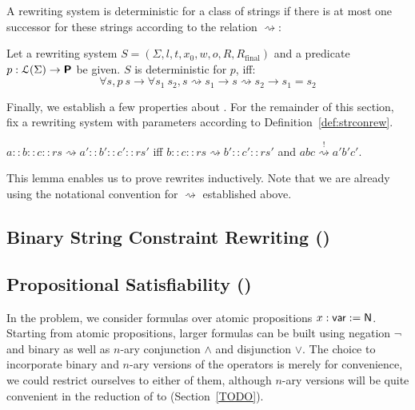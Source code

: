 \documentclass[a4paper,UKenglish,cleveref, autoref]{lipics-v2019}
\newcommand{\strent}{\rightsquigarrow}
\newcommand{\constrent}{\overset{!}{\rightsquigarrow}}
\newcommand{\Rfinal}{R_{\text{final}}}
\begin{document}
A rewriting system is deterministic for a class of strings if there is at most one successor for these strings according to the relation $\strent{}$:
\begin{definition}[Determinism]\label{def:rewdet}
  Let a rewriting system $S = (\Sigma, l, t, x_0, w, o, R, \Rfinal)$ and a predicate $p : \mathcal{L} (\Sigma) \rightarrow \textsf{\bfseries P}$ be given. 
  $S$ is deterministic for $p$, iff: 
  \[ \forall s, p~s \rightarrow \forall s_1~s_2, s \strent{} s_1 \rightarrow s \strent{} s_2 \rightarrow s_1 = s_2 \]
\end{definition}


Finally, we establish a few properties about \strconrew{}. For the remainder of this section, fix a rewriting system with parameters according to Definition~\ref{def:strconrew}.

\begin{lemma}\label{lem:rewind}
  $a :: b :: c :: rs \strent{} a' :: b' :: c' :: rs'$ iff $b :: c :: rs \strent{} b' :: c' :: rs'$ and $abc \constrent{} a'b'c'$. 
\end{lemma}
This lemma enables us to prove rewrites inductively. Note that we are already using the notational convention for $\strent{}$ established above.

\subsection{Binary String Constraint Rewriting (\binstrconrew{})}


\subsection{Propositional Satisfiability (\csat{})}
\newcommand{\var}{\textsf{var}}
\newcommand{\literal}{\textsf{literal}}
\newcommand{\clause}{\textsf{clause}}
\newcommand{\cnf}{\textsf{cnf}}
\newcommand{\assgn}{\textsf{assgn}}
\newcommand{\eval}[2]{\mathcal{E}~#1~#2}
\newcommand{\for}{\textsf{For}}


In the \csat{} problem, we consider formulas over atomic propositions $x : \var := \nat$. Starting from atomic propositions, larger formulas can be built using negation $\lnot$ and binary as well as $n$-ary conjunction $\land$ and disjunction $\lor$. The choice to incorporate binary and $n$-ary versions of the operators is merely for convenience, we could restrict ourselves to either of them, although $n$-ary versions will be quite convenient in the reduction of \csat{} to \sat{} (Section~\ref{TODO}). 
\end{document}
